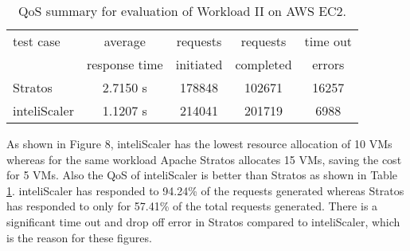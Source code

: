 \begin{table}[h!]
\centering
\caption{QoS summary for evaluation of Workload II on AWS EC2.}
\label{table:analysis_qos_workload_5}
\begin{tabular}{|l|c|c|c|c|}
\hline

test case & average  & requests  & requests  & time out  \\
& response time & initiated & completed & errors \\ \hline

Stratos & 2.7150 s & 178848 & 102671 & 16257\\ \hline

inteliScaler & 1.1207 s & 214041 & 201719 & 6988\\ \hline

\end{tabular}
\end{table}

As shown in Figure 8, inteliScaler has the lowest resource allocation of 10 VMs whereas for the same workload Apache Stratos allocates 15 VMs, saving the cost for 5 VMs. Also the QoS of inteliScaler is better than Stratos as shown in Table \ref{table:analysis_qos_workload_5}. inteliScaler has responded to 94.24\% of the requests generated whereas Stratos has responded to only for 57.41\% of the total requests generated. There is a significant time out and drop off error in Stratos compared to inteliScaler, which is the reason for these figures. 